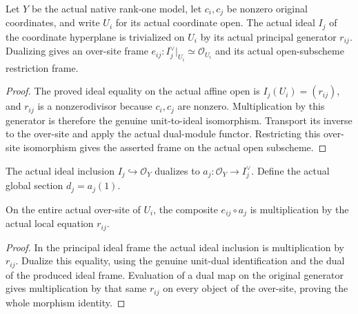 \begin{definition}
\label{def:seven-native-original-coordinate-frames}
\leanok
Let $Y$ be the actual native rank-one model, let $c_i,c_j$ be nonzero
original coordinates, and write $U_i$ for its actual coordinate open.
The actual ideal $I_j$ of the coordinate hyperplane is trivialized on $U_i$
by its actual principal generator $r_{ij}$. Dualizing gives an over-site
frame $e_{ij}:I_j^\vee|_{U_i}\simeq\mathcal O_{U_i}$ and its actual
open-subscheme restriction frame.
\end{definition}
\begin{proof}
The proved ideal equality on the actual affine open is
$I_j(U_i)=(r_{ij})$, and $r_{ij}$ is a nonzerodivisor because $c_i,c_j$
are nonzero. Multiplication by this generator is therefore the genuine
unit-to-ideal isomorphism. Transport its inverse to the over-site and
apply the actual dual-module functor. Restricting this over-site
isomorphism gives the asserted frame on the actual open subscheme.
\end{proof}

\begin{definition}
\label{def:seven-native-original-coordinate-pole-section}
\leanok
The actual ideal inclusion $I_j\hookrightarrow\mathcal O_Y$ dualizes to
$a_j:\mathcal O_Y\to I_j^\vee$. Define the actual global section
$d_j=a_j(1)$.
\end{definition}

\begin{theorem}
\label{thm:seven-native-original-coordinate-pole-map}
\leanok
On the entire actual over-site of $U_i$, the composite $e_{ij}\circ a_j$
is multiplication by the actual local equation $r_{ij}$.
\end{theorem}
\begin{proof}
In the principal ideal frame the actual ideal inclusion is multiplication
by $r_{ij}$. Dualize this equality, using the genuine unit-dual
identification and the dual of the produced ideal frame. Evaluation of a
dual map on the original generator gives multiplication by that same
$r_{ij}$ on every object of the over-site, proving the whole morphism
identity.
\end{proof}

